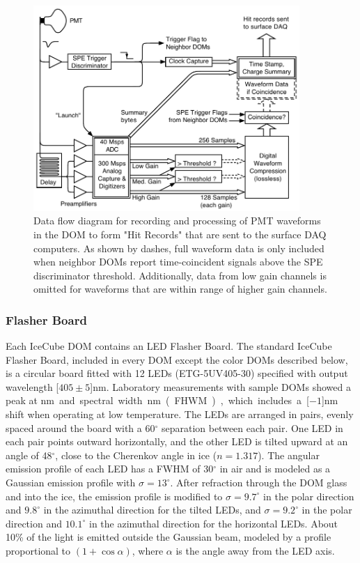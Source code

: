 \begin{figure}[h]
 \centering
 \includegraphics[width=0.9\textwidth]{graphics/dom/functional/domfig3-DOMDataFlow.pdf}
 \caption{Data flow diagram for recording and processing of PMT waveforms in the DOM to form 
 "Hit Records" that are sent to the surface DAQ computers.  As shown by dashes, full waveform data is only included
 when neighbor DOMs report time-coincident signals above the SPE discriminator threshold.  Additionally,
 data from low gain channels is omitted for waveforms that are within range of higher gain channels.}
 \label{fig:domdataflow}
\end{figure}

\subsubsection{\label{sec:flasher}Flasher Board}

Each IceCube DOM contains an LED Flasher Board. The standard IceCube
Flasher Board, included in every DOM except the color DOMs
described below, is a circular board fitted with 12 LEDs (ETG-5UV405-30)
specified with output wavelength \unit[$405\pm5$]nm.  Laboratory
measurements with sample DOMs showed a peak at
\unit[399]nm and spectral width \unit[14]nm (FHWM), which includes a
\unit[$-1$]nm shift when operating at low temperature.
The LEDs are arranged in pairs, evenly spaced around the board
with a 60$^{\circ}$ separation between each pair. One LED in each pair
points outward horizontally, and the other LED is tilted upward at an angle
of 48$^{\circ}$, close to the Cherenkov angle in ice ($n =
1.317$).  The angular emission profile of each LED has a FWHM of
30$^{\circ}$ in air and is modeled as a Gaussian emission profile
with $\sigma = 13^{\circ}$. After refraction through the DOM glass and into
the ice, the emission profile is modified to $\sigma = 9.7^{\circ}$ in the polar direction
and $9.8^{\circ}$ in the azimuthal direction for the tilted LEDs, and $\sigma=9.2^{\circ}$ in the polar direction
and $10.1^{\circ}$ in the azimuthal direction for the horizontal LEDs.
About 10\% of the light is emitted outside the Gaussian beam, modeled by
a profile proportional to $(1+\cos{\alpha})$, where $\alpha$ is the angle
away from the LED axis.

